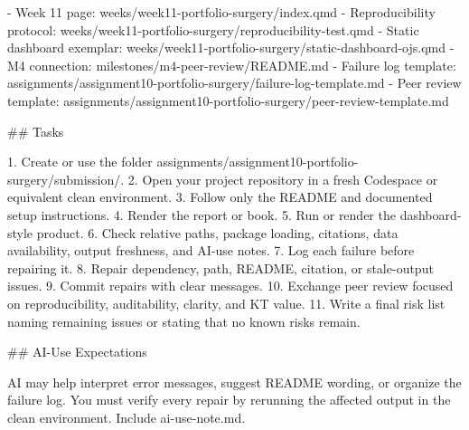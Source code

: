 \documentclass[
  letterpaper,
  DIV=11,
  numbers=noendperiod,
  oneside]{scrreprt}
\newenvironment{Shaded}{\begin{snugshade}}{\end{snugshade}}
\newcommand{\FunctionTok}[1]{\textcolor[rgb]{0.28,0.35,0.67}{#1}}
\newcommand{\InformationTok}[1]{\textcolor[rgb]{0.37,0.37,0.37}{#1}}
\newcommand{\NormalTok}[1]{\textcolor[rgb]{0.00,0.23,0.31}{#1}}
\newcommand{\SpecialStringTok}[1]{\textcolor[rgb]{0.13,0.47,0.30}{#1}}
\begin{document}
\begin{Shaded}
\begin{Highlighting}[numbers=left,,]
\SpecialStringTok{{-} }\NormalTok{Week 11 page: }\InformationTok{\textasciigrave{}weeks/week11{-}portfolio{-}surgery/index.qmd\textasciigrave{}}
\SpecialStringTok{{-} }\NormalTok{Reproducibility protocol: }\InformationTok{\textasciigrave{}weeks/week11{-}portfolio{-}surgery/reproducibility{-}test.qmd\textasciigrave{}}
\SpecialStringTok{{-} }\NormalTok{Static dashboard exemplar: }\InformationTok{\textasciigrave{}weeks/week11{-}portfolio{-}surgery/static{-}dashboard{-}ojs.qmd\textasciigrave{}}
\SpecialStringTok{{-} }\NormalTok{M4 connection: }\InformationTok{\textasciigrave{}milestones/m4{-}peer{-}review/README.md\textasciigrave{}}
\SpecialStringTok{{-} }\NormalTok{Failure log template: }\InformationTok{\textasciigrave{}assignments/assignment10{-}portfolio{-}surgery/failure{-}log{-}template.md\textasciigrave{}}
\SpecialStringTok{{-} }\NormalTok{Peer review template: }\InformationTok{\textasciigrave{}assignments/assignment10{-}portfolio{-}surgery/peer{-}review{-}template.md\textasciigrave{}}

\FunctionTok{\#\# Tasks}

\SpecialStringTok{1. }\NormalTok{Create or use the folder }\InformationTok{\textasciigrave{}assignments/assignment10{-}portfolio{-}surgery/submission/\textasciigrave{}}\NormalTok{.}
\SpecialStringTok{2. }\NormalTok{Open your project repository in a fresh Codespace or equivalent clean environment.}
\SpecialStringTok{3. }\NormalTok{Follow only the README and documented setup instructions.}
\SpecialStringTok{4. }\NormalTok{Render the report or book.}
\SpecialStringTok{5. }\NormalTok{Run or render the dashboard{-}style product.}
\SpecialStringTok{6. }\NormalTok{Check relative paths, package loading, citations, data availability, output freshness, and AI{-}use notes.}
\SpecialStringTok{7. }\NormalTok{Log each failure before repairing it.}
\SpecialStringTok{8. }\NormalTok{Repair dependency, path, README, citation, or stale{-}output issues.}
\SpecialStringTok{9. }\NormalTok{Commit repairs with clear messages.}
\SpecialStringTok{10. }\NormalTok{Exchange peer review focused on reproducibility, auditability, clarity, and KT value.}
\SpecialStringTok{11. }\NormalTok{Write a final risk list naming remaining issues or stating that no known risks remain.}

\FunctionTok{\#\# AI{-}Use Expectations}

\NormalTok{AI may help interpret error messages, suggest README wording, or organize the failure log. You must verify every repair by rerunning the affected output in the clean environment. Include }\InformationTok{\textasciigrave{}ai{-}use{-}note.md\textasciigrave{}}\NormalTok{.}


\end{Highlighting}
\end{Shaded}
\end{document}
